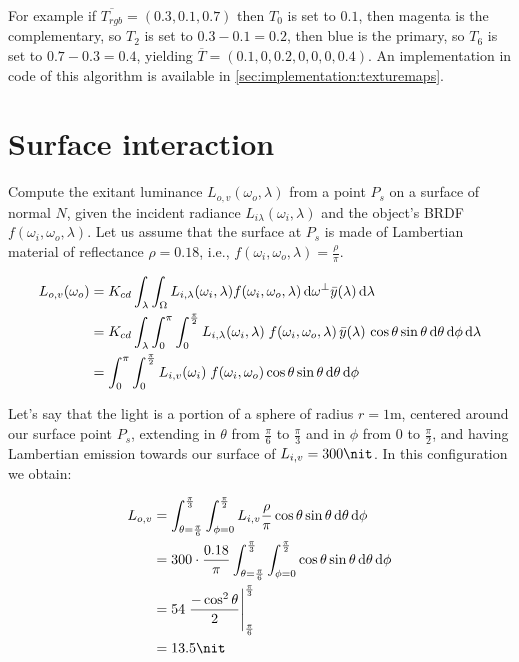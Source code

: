 For example if $\overline{T_{rgb}} = (0.3, 0.1, 0.7)$ then $T_0$ is set to $0.1$,
then magenta is the complementary, so $T_2$ is set to $0.3-0.1 = 0.2$, then
blue is the primary, so $T_6$ is set to $0.7 - 0.3 = 0.4$, yielding
$\overline{T} = (0.1, 0, 0.2, 0, 0, 0, 0.4)$. An implementation in code of
this algorithm is available in \cref{sec:implementation:texturemaps}.

\section{Surface interaction}

Compute the exitant luminance $L_{o,v}(\omega_o, \lambda)$ from a point
$P_s$ on a surface of normal $N$, given the incident radiance
$L_{i\lambda}(\omega_i, \lambda)$ and the object’s BRDF $f(\omega_i, \omega_o, \lambda)$.
Let us assume that the surface at $P_s$ is made of Lambertian material of reflectance $\rho=0.18$, i.e., $f(\omega_i, \omega_o, \lambda) = \frac \rho \pi$. 

\begin{displaymath}
\begin{split}
    L_{o,v}(\omega_o) &= K_{cd} \int_\lambda \int_\Omega L_{i,\lambda}(\omega_i, \lambda) f(\omega_i, \omega_o, \lambda) \d \omega^{\bot} \bar y(\lambda) \d\lambda \\
    &= K_{cd} \int_\lambda \int_0^\pi \int_0^{\frac \pi 2}  L_{i,\lambda}(\omega_i, \lambda)\;f(\omega_i, \omega_o, \lambda)\, \bar y(\lambda)\, \cos\theta \sin\theta \d\theta \d\phi \d\lambda \\
    &= \int_0^\pi \int_0^{\frac \pi 2}  L_{i,v}(\omega_i)\;f(\omega_i, \omega_o)\cos\theta \sin\theta \d\theta \d\phi
\end{split}
\end{displaymath}

Let's say that the light is a portion of a sphere of radius $r = \num{1}\unit{\meter}$, centered
around our surface point $P_s$, extending in $\theta$ from $\frac\pi6$ to $\frac\pi3$ and in
$\phi$ from $0$ to $\frac\pi2$, and having Lambertian emission towards our
surface of $L_{i,v} = \num{300}\unit{\nit}$.
In this configuration we obtain:

\begin{align*}
L_{o,v} &= \int_{\theta = \frac\pi 6}^\frac\pi 3 \int _{\phi = 0}^\frac\pi
2 L_{i,v} \frac\rho\pi \cos\theta \sin\theta \d\theta \d\phi \\
             &= 300\cdot \frac{0.18}\pi \int_{\theta = \frac\pi 6}^\frac\pi 3 \int _{\phi = 0}^\frac\pi 2 \cos\theta \sin\theta \d\theta \d\phi \\
             &= 54 \left.\frac{-\cos^2\theta}{2}\right|_{\frac\pi 6}^\frac\pi 3 \\
             &= \num{13.5}\unit{\nit}
\end{align*}

